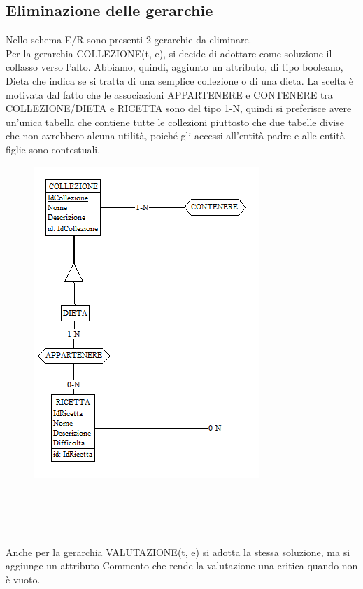 ﻿\documentclass[a4paper,12pt]{report}
\begin{document}
\subsection{Eliminazione delle gerarchie}
Nello schema E/R sono presenti 2 gerarchie da eliminare.\\
Per la gerarchia COLLEZIONE(t, e), si decide di adottare come soluzione il collasso verso l'alto.
Abbiamo, quindi, aggiunto un attributo, di tipo booleano, Dieta che indica se si tratta di una semplice collezione o di una dieta.
La scelta è motivata dal fatto che le associazioni APPARTENERE e CONTENERE tra COLLEZIONE/DIETA e RICETTA sono del tipo 1-N, quindi si preferisce avere
un'unica tabella che contiene tutte le collezioni piuttosto che due tabelle divise che non avrebbero alcuna utilità, poiché gli accessi all'entità padre e alle entità figlie sono contestuali.\\
\begin{figure}[h!]
    \centering
    \includegraphics[width=0.6\linewidth]{app_images/gerarchia_collezione.png}
\end{figure}
\\\\\\\\Anche per la gerarchia VALUTAZIONE(t, e) si adotta la stessa soluzione, ma si aggiunge un attributo Commento che rende la valutazione una critica quando non è vuoto.\\
\end{document}
